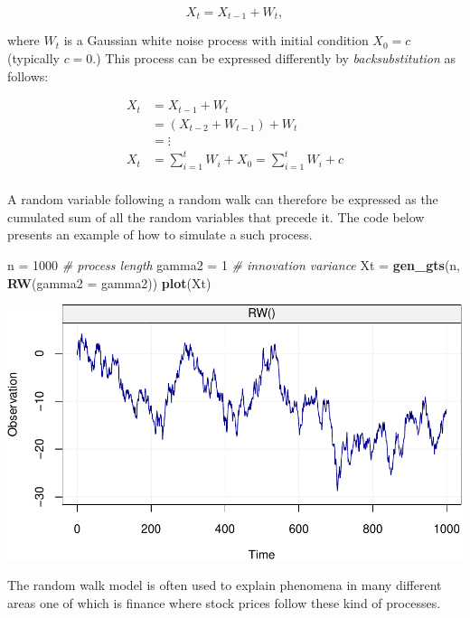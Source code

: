 \documentclass[]{book}
\newenvironment{Shaded}{\begin{snugshade}}{\end{snugshade}}
\newcommand{\KeywordTok}[1]{\textcolor[rgb]{0.13,0.29,0.53}{\textbf{#1}}}
\newcommand{\DataTypeTok}[1]{\textcolor[rgb]{0.13,0.29,0.53}{#1}}
\newcommand{\DecValTok}[1]{\textcolor[rgb]{0.00,0.00,0.81}{#1}}
\newcommand{\StringTok}[1]{\textcolor[rgb]{0.31,0.60,0.02}{#1}}
\newcommand{\CommentTok}[1]{\textcolor[rgb]{0.56,0.35,0.01}{\textit{#1}}}
\newcommand{\NormalTok}[1]{#1}
\theoremstyle{definition}
\theoremstyle{definition}
\theoremstyle{definition}
\theoremstyle{remark}
\begin{document}
\[X_t = X_{t-1} + W_t,\]

where \(W_t\) is a Gaussian white noise process with initial condition
\(X_0 = c\) (typically \(c = 0\).) This process can be expressed
differently by \emph{backsubstitution} as follows:

\[\begin{aligned}
  {X_t} &= {X_{t - 1}} + {W_t} \\
   &= \left( {{X_{t - 2}} + {W_{t - 1}}} \right) + {W_t} \\
   &= \vdots \\
  {X_t} &= \sum\limits_{i = 1}^t {{W_i}} + X_0 =  \sum\limits_{i = 1}^t {{W_i}} + c \\ 
\end{aligned} \]

A random variable following a random walk can therefore be expressed as
the cumulated sum of all the random variables that precede it. The code
below presents an example of how to simulate a such process.

\begin{Shaded}
\begin{Highlighting}[]
\NormalTok{n =}\StringTok{ }\DecValTok{1000}                               \CommentTok{# process length}
\NormalTok{gamma2 =}\StringTok{ }\DecValTok{1}                             \CommentTok{# innovation variance}
\NormalTok{Xt =}\StringTok{ }\KeywordTok{gen_gts}\NormalTok{(n, }\KeywordTok{RW}\NormalTok{(}\DataTypeTok{gamma2 =}\NormalTok{ gamma2))}
\KeywordTok{plot}\NormalTok{(Xt)}
\end{Highlighting}
\end{Shaded}

\includegraphics{ts_files/figure-latex/example_RW-1.pdf}

The random walk model is often used to explain phenomena in many
different areas one of which is finance where stock prices follow these
kind of processes.
\end{document}
